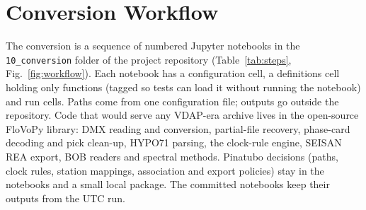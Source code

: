 \documentclass[linenum]{SSA-SRL}
\newcommand{\file}[1]{\texttt{#1}}
\begin{document}
\section{Conversion Workflow}

The conversion is a sequence of numbered Jupyter notebooks in the \file{10\_conversion} folder of the project repository (Table~\ref{tab:steps}, Fig.~\ref{fig:workflow}). Each notebook has a configuration cell, a definitions cell holding only functions (tagged so tests can load it without running the notebook) and run cells. Paths come from one configuration file; outputs go outside the repository. Code that would serve any VDAP-era archive lives in the open-source FloVoPy library: DMX reading and conversion, partial-file recovery, phase-card decoding and pick clean-up, HYPO71 parsing, the clock-rule engine, SEISAN REA export, BOB readers and spectral methods. Pinatubo decisions (paths, clock rules, station mappings, association and export policies) stay in the notebooks and a small local package. The committed notebooks keep their outputs from the UTC run.
\end{document}
